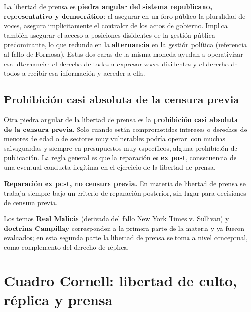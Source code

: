 \documentclass[12pt,oneside]{book}
\begin{document}
La libertad de prensa es \textbf{piedra angular del sistema republicano, representativo y democrático}: al asegurar en un foro público la pluralidad de voces, asegura implícitamente el contralor de los actos de gobierno. Implica también asegurar el acceso a posiciones disidentes de la gestión pública predominante, lo que redunda en la \textbf{alternancia} en la gestión política (referencia al fallo de Formosa). Estas dos caras de la misma moneda ayudan a operativizar esa alternancia: el derecho de todos a expresar voces disidentes y el derecho de todos a recibir esa información y acceder a ella.

\subsection{Prohibición casi absoluta de la censura previa}

Otra piedra angular de la libertad de prensa es la \textbf{prohibición casi absoluta de la censura previa}. Solo cuando están comprometidos intereses o derechos de menores de edad o de sectores muy vulnerables podría operar, con muchas salvaguardas y siempre en presupuestos muy específicos, alguna prohibición de publicación. La regla general es que la reparación es \textbf{ex post}, consecuencia de una eventual conducta ilegítima en el ejercicio de la libertad de prensa.

\begin{important}
\textbf{Reparación ex post, no censura previa.} En materia de libertad de prensa se trabaja siempre bajo un criterio de reparación posterior, sin lugar para decisiones de censura previa.
\end{important}

\begin{note}
Los temas \textbf{Real Malicia} (derivada del fallo New York Times v. Sullivan) y \textbf{doctrina Campillay} corresponden a la primera parte de la materia y ya fueron evaluados; en esta segunda parte la libertad de prensa se toma a nivel conceptual, como complemento del derecho de réplica.
\end{note}

\section{Cuadro Cornell: libertad de culto, réplica y prensa}
\end{document}

